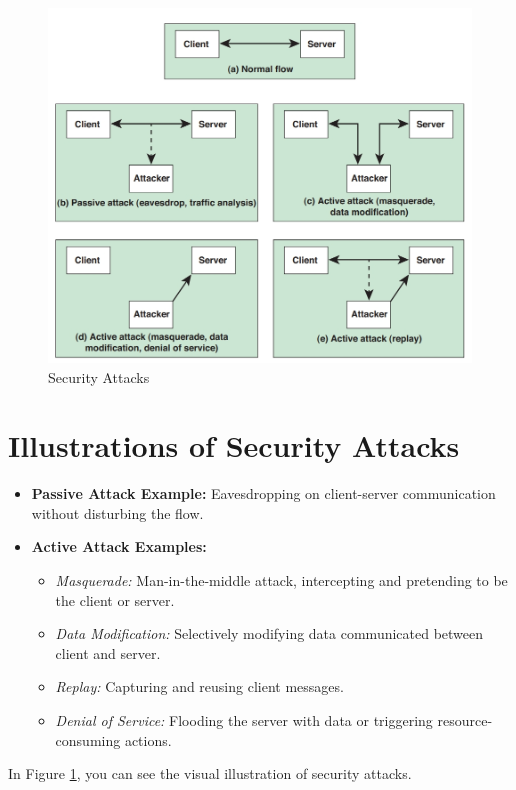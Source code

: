 \begin{figure}[h!]
    \centering
    \includegraphics[width=\linewidth]{Data_Privacy_and_Cryptography/Figures/security_attacks.jpeg}
    \caption{Security Attacks}
    \label{fig:security_attacks}
\end{figure}

\section{Illustrations of Security Attacks}
\begin{itemize}
    \item \textbf{Passive Attack Example:} Eavesdropping on client-server communication without disturbing the flow.
    \item \textbf{Active Attack Examples:}
    \begin{itemize}
        \item \textit{Masquerade:} Man-in-the-middle attack, intercepting and pretending to be the client or server.
        \item \textit{Data Modification:} Selectively modifying data communicated between client and server.
        \item \textit{Replay:} Capturing and reusing client messages.
        \item \textit{Denial of Service:} Flooding the server with data or triggering resource-consuming actions.
    \end{itemize}
\end{itemize}
In Figure \ref{fig:security_attacks}, you can see the visual illustration of security attacks.